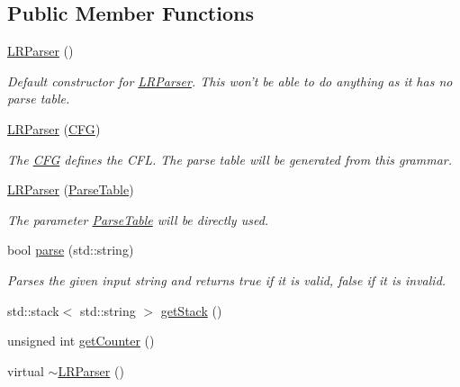 \subsection*{\-Public \-Member \-Functions}
\begin{DoxyCompactItemize}
\item 
\hyperlink{classLRParser_adf2fe54095f02900d06389007a1e5f53}{\-L\-R\-Parser} ()
\begin{DoxyCompactList}\small\item\em \-Default constructor for \hyperlink{classLRParser}{\-L\-R\-Parser}. \-This won't be able to do anything as it has no parse table. \end{DoxyCompactList}\item 
\hyperlink{classLRParser_abee4e9919e49f66051167487fb467601}{\-L\-R\-Parser} (\hyperlink{classCFG}{\-C\-F\-G})
\begin{DoxyCompactList}\small\item\em \-The \hyperlink{classCFG}{\-C\-F\-G} defines the \-C\-F\-L. \-The parse table will be generated from this grammar. \end{DoxyCompactList}\item 
\hyperlink{classLRParser_a52727298bd32f6b4ac91d2e1351ffe49}{\-L\-R\-Parser} (\hyperlink{classParseTable}{\-Parse\-Table})
\begin{DoxyCompactList}\small\item\em \-The parameter \hyperlink{classParseTable}{\-Parse\-Table} will be directly used. \end{DoxyCompactList}\item 
bool \hyperlink{classLRParser_a0657ab1ec68beb8fce3756f7204079b4}{parse} (std\-::string)
\begin{DoxyCompactList}\small\item\em \-Parses the given input string and returns true if it is valid, false if it is invalid. \end{DoxyCompactList}\item 
std\-::stack$<$ std\-::string $>$ \hyperlink{classLRParser_ac832f117eb1ff5f21d9ed0a7426937a5}{get\-Stack} ()
\item 
unsigned int \hyperlink{classLRParser_a817415c2083c538a0380eace8ec4df5e}{get\-Counter} ()
\item 
virtual \hyperlink{classLRParser_a85b1487a331f1a617ee74965264fcf8f}{$\sim$\-L\-R\-Parser} ()
\end{DoxyCompactItemize}
